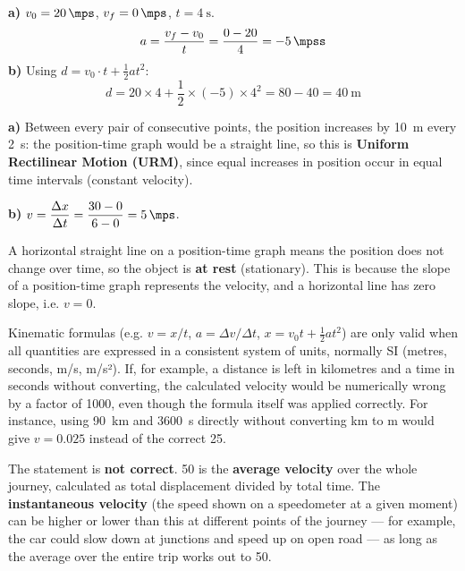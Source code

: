 \documentclass[11pt,a4paper]{article}
\begin{document}
\begin{solucioneng}
\textbf{a)} $v_0 = \qty{20}{\mps}$, $v_f = \qty{0}{\mps}$, $t = \qty{4}{\s}$.
\[
a = \dfrac{v_f - v_0}{t} = \dfrac{0-20}{4} = \qty{-5}{\mpss}
\]
\textbf{b)} Using $d = v_0 \cdot t + \frac{1}{2} a t^2$:
\[
d = 20 \times 4 + \frac{1}{2} \times (-5) \times 4^2 = 80 - 40 = \qty{40}{\m}
\]
\end{solucioneng}

\begin{solucioneng}
\textbf{a)} Between every pair of consecutive points, the position increases by \qty{10}{\m} every \qty{2}{\s}: the position-time graph would be a straight line, so this is \textbf{Uniform Rectilinear Motion (URM)}, since equal increases in position occur in equal time intervals (constant velocity).

\textbf{b)} $v = \dfrac{\Delta x}{\Delta t} = \dfrac{30-0}{6-0} = \qty{5}{\mps}$.
\end{solucioneng}

\begin{solucioneng}
A horizontal straight line on a position-time graph means the position does not change over time, so the object is \textbf{at rest} (stationary). This is because the slope of a position-time graph represents the velocity, and a horizontal line has zero slope, i.e. $v = 0$.
\end{solucioneng}

\begin{solucioneng}
Kinematic formulas (e.g. $v = x/t$, $a = \Delta v/\Delta t$, $x = v_0 t + \frac{1}{2}at^2$) are only valid when all quantities are expressed in a consistent system of units, normally SI (metres, seconds, m/s, m/s²). If, for example, a distance is left in kilometres and a time in seconds without converting, the calculated velocity would be numerically wrong by a factor of 1000, even though the formula itself was applied correctly. For instance, using \qty{90}{\km} and \qty{3600}{\s} directly without converting km to m would give $v = 0.025$ instead of the correct \qty{25}{\mps}.
\end{solucioneng}

\begin{solucioneng}
The statement is \textbf{not correct}. \qty{50}{\kmph} is the \textbf{average velocity} over the whole journey, calculated as total displacement divided by total time. The \textbf{instantaneous velocity} (the speed shown on a speedometer at a given moment) can be higher or lower than this at different points of the journey --- for example, the car could slow down at junctions and speed up on open road --- as long as the average over the entire trip works out to \qty{50}{\kmph}.
\end{solucioneng}
\end{document}
